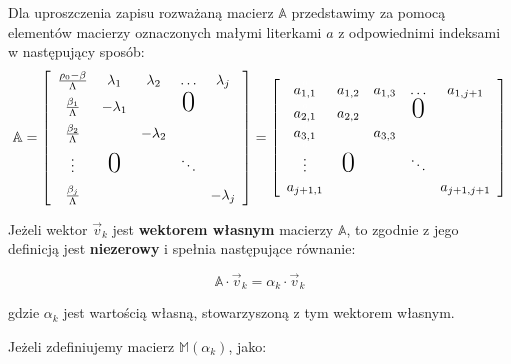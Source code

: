 	Dla uproszczenia zapisu rozważaną macierz $\mathbb{A}$ przedstawimy za pomocą elementów macierzy oznaczonych małymi literkami $a$ z odpowiednimi indeksami w następujący sposób:
	\begin{equation}
		\mathbb{A}= 
		\left[\begin{array}{ccccc}
			\frac{\rho_0-\beta}{\Lambda}&\lambda_1&\lambda_2&\hdots&\lambda_j\\
			\uu{\frac{\beta_1}{\Lambda}}&-\lambda_1&&\text{\huge0}&\\
			\uu{\frac{\beta_2}{\Lambda}}&&-\lambda_2&&\\
			\uu{\vdots}&\text{\huge0}&&\ddots&\\
			\uu{\frac{\beta_j}{\Lambda}}&&&&-\lambda_j
		\end{array}\right]
		=
		\left[\begin{array}{ccccc}
			\uu{a_{1,1}}&a_{1,2}&a_{1,3}&\hdots&a_{1,j+1}\\
			\uu{a_{2,1}}&a_{2,2}&&\text{\huge0}&\\
			\uu{a_{3,1}}&&a_{3,3}&&\\
			\uu{\vdots}&\text{\huge0}&&\ddots&\\
			\uu{a_{j+1,1}}&&&&a_{j+1,j+1}
		\end{array}\right]
		\label{macierouuu}
	\end{equation}
	
	
	\noindent Jeżeli wektor $\vec{v}_k$ jest \textbf{wektorem własnym} macierzy $\mathbb{A}$, to zgodnie z jego definicją jest \textbf{niezerowy} i spełnia następujące równanie: 
	
	\begin{equation}
		\mathbb{A}\cdot \vec{v}_k = \alpha_k \cdot \vec{v}_k 
		\label{czczczczcz}
	\end{equation}
	
	\noindent gdzie $\alpha_k$ jest wartością własną, stowarzyszoną z tym wektorem własnym.
	
	Jeżeli zdefiniujemy macierz $\mathbb{M}(\alpha_k)$, jako:
	
